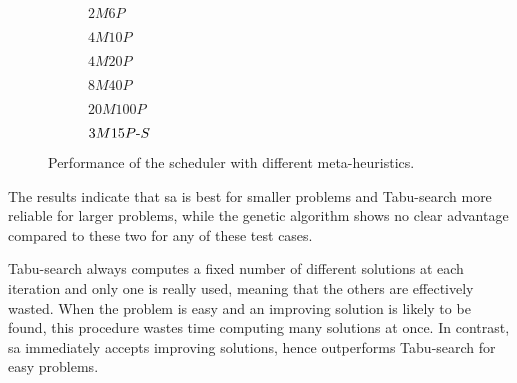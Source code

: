 \documentclass[main.tex]{subfiles}
\begin{document}
\begin{figure}[htbp]
    \centering
    \begin{subfigure}[b]{0.48\linewidth}
        \centering
        \resizebox{\linewidth}{!}{}
        \caption{$2M6P$}
        \label{fig:boxplot1}
    \end{subfigure}%
    \hfill
    \begin{subfigure}[b]{0.48\linewidth}
        \centering
        \resizebox{\linewidth}{!}{}
        \caption{$4M10P$}
        \label{fig:boxplot2}
    \end{subfigure}%
    
    \vspace{12mm}
    \begin{subfigure}{0.48\linewidth}
        \centering
        \resizebox{\linewidth}{!}{}
        \caption{$4M20P$}
        \label{fig:boxplot3}
    \end{subfigure}%
    \hfill
    \begin{subfigure}{0.48\linewidth}
        \centering
        \resizebox{\linewidth}{!}{}
        \caption{$8M40P$}
        \label{fig:boxplot4}
    \end{subfigure}%
    
    \vspace{12mm}
    \begin{subfigure}{0.48\linewidth}
        \centering
        \resizebox{\linewidth}{!}{}
        \caption{$20M100P$}
        \label{fig:boxplot5}
    \end{subfigure}%
    \hfill
    \begin{subfigure}{0.48\linewidth}
        \centering
        \resizebox{\linewidth}{!}{}
        \caption{$3M15P\text{-} S$}
        \label{fig:boxplot6}
    \end{subfigure}%
    \caption{Performance of the scheduler with different meta-heuristics.}
    \label{fig:boxplots}
\end{figure}


The results indicate that \gls{sa} is best for smaller problems and Tabu-search more reliable for larger problems, while the genetic algorithm shows no clear advantage compared to these two for any of these test cases.

Tabu-search always computes a fixed number of different solutions at each iteration and only one is really used, meaning that the others are effectively wasted.
When the problem is easy and an improving solution is likely to be found, this procedure wastes time computing many solutions at once.
In contrast, \gls{sa} immediately accepts improving solutions, hence outperforms Tabu-search for easy problems. 
\end{document}
